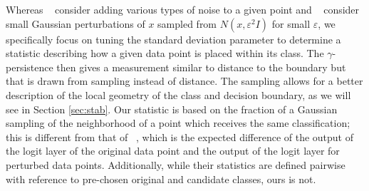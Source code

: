 

Whereas ~\cite{roth19aodds} consider adding various types of noise to a given point and ~\cite{hosseini2019odds} consider small Gaussian perturbations of $x$ sampled from $N(x,\varepsilon^2 I)$ for small $\varepsilon$, %
we specifically focus on %
tuning the standard deviation parameter to determine a statistic describing how a given data point is placed within its class. The $\gamma$-persistence then gives a measurement similar to distance to the boundary but that is drawn from sampling instead of distance. The sampling allows for a better description of the local geometry of the class and decision boundary, as we will see in Section \ref{sec:stab}. Our statistic is based on the fraction of a Gaussian sampling of the neighborhood of a point which receives the same classification; this is different from that of ~\cite{roth19aodds}, which is the expected difference of the output of the logit layer of the original data point and the output of the logit layer for perturbed data points.  Additionally, while their statistics are defined pairwise with reference to pre-chosen original and candidate classes, ours is not.


